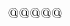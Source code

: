 $$\def\vec{\mathaccent"017E }
\newcount\skewcharcount@
\newcount\familycount@
\def\theskewchar@{\familycount@\@ne
 \global\skewcharcount@\the\skewchar\textfont\@ne                           %
 \ifnum\fam>\m@ne\ifnum\fam<16
  \global\familycount@\the\fam\relax
  \global\skewcharcount@\the\skewchar\textfont\the\fam\relax\fi\fi          %
 \ifnum\skewcharcount@>\m@ne
  \ifnum\skewcharcount@<128
  \multiply\familycount@256
  \global\advance\skewcharcount@\familycount@
  \global\advance\skewcharcount@28672
  \mathchar\skewcharcount@\else
  \global\skewcharcount@\m@ne\fi\else
 \global\skewcharcount@\m@ne\fi}                                            %
\newcount\pointcount@
\def\getpoints@#1.#2\getpoints@{\pointcount@#1 }
\newdimen\accentdimen@
\newcount\accentmu@
\def\dimentomu@{\multiply\accentdimen@ 100
 \expandafter\getpoints@\the\accentdimen@\getpoints@
 \multiply\pointcount@18
 \divide\pointcount@\@m
 \global\accentmu@\pointcount@}
\def\Makeacc@#1#2{\def#1{\RIfM@\DN@{\mathaccent@
 {"\accentclass@#2 }}\else\DN@{\nonmatherr@{#1}}\fi\next@}}
\def\unbracefonts@{\let\Cal@\Cal@@\let\roman@\roman@@\let\bold@\bold@@
 \let\slanted@\slanted@@}
\def\mathaccent@#1#2{\ifnum\fam=\m@ne\xdef\thefam@{1}\else
 \xdef\thefam@{\the\fam}\fi                                                 %
 \accentdimen@\z@                                                           %
 \setboxz@h{\unbracefonts@$\m@th\fam\thefam@\relax#2$}%
 \ifdim\accentdimen@=\z@\DN@{\mathaccent#1{#2}}%
  \setbox@ne\hbox{\unbracefonts@$\m@th\fam\thefam@\relax#2\theskewchar@$}%
  \setbox\tw@\hbox{$\m@th\ifnum\skewcharcount@=\m@ne\else
   \mathchar\skewcharcount@\fi$}%
  \global\accentdimen@\wd@ne\global\advance\accentdimen@-\wdz@
  \global\advance\accentdimen@-\wd\tw@                                     %
  \global\multiply\accentdimen@\tw@
  \dimentomu@\global\advance\accentmu@\@ne                                 %
 \else\DN@{{\mathaccent#1{#2\mkern\accentmu@ mu}%
    \mkern-\accentmu@ mu}{}}\fi                                             %
 \next@}\Makeacc@\Hat{05E}
\Makeacc@\Check{014}
\Makeacc@\Tilde{07E}
\Makeacc@\Acute{013}
\Makeacc@\Grave{012}
\Makeacc@\Dot{05F}
\Makeacc@\Ddot{07F}
\Makeacc@\Breve{015}
\Makeacc@\Bar{016}
\def\Vec{\RIfM@\DN@{\mathaccent@{"017E }}\else
 \DN@{\nonmatherr@\Vec}\fi\next@}
\def\newbox@{\alloc@4\box\chardef\insc@unt}
\def\accentedsymbol#1#2{\expandafter\newbox@\csname\expandafter
  \eat@\string#1@box\endcsname
 \expandafter\setbox\csname\expandafter\eat@
  \string#1@box\endcsname\hbox{$\m@th#2$}\define
}$$
